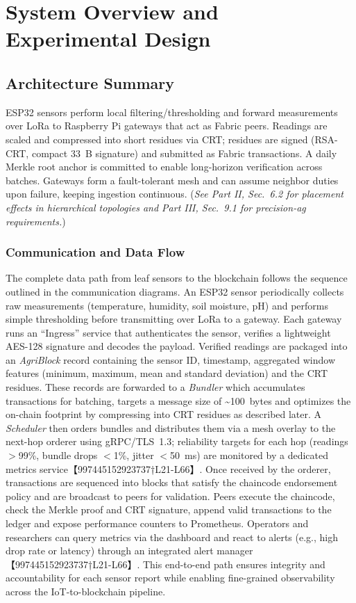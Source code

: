 \section{System Overview and Experimental Design}

\subsection{Architecture Summary}
ESP32 sensors perform local filtering/thresholding and forward measurements over LoRa to Raspberry Pi gateways that act as Fabric peers. Readings are scaled and compressed into short residues via CRT; residues are signed (RSA-CRT, compact 33~B signature) and submitted as Fabric transactions. A daily Merkle root anchor is committed to enable long-horizon verification across batches. Gateways form a fault-tolerant mesh and can assume neighbor duties upon failure, keeping ingestion continuous. (\emph{See Part II, Sec.~6.2 for placement effects in hierarchical topologies and Part III, Sec.~9.1 for precision-ag requirements.}) %

\subsubsection{Communication and Data Flow}
The complete data path from leaf sensors to the blockchain follows the sequence outlined in the communication diagrams.  An ESP32 sensor periodically collects raw measurements (temperature, humidity, soil moisture, pH) and performs simple thresholding before transmitting over LoRa to a gateway.  Each gateway runs an ``Ingress'' service that authenticates the sensor, verifies a lightweight AES-128 signature and decodes the payload.  Verified readings are packaged into an \textit{AgriBlock} record containing the sensor ID, timestamp, aggregated window features (minimum, maximum, mean and standard deviation) and the CRT residues.  These records are forwarded to a \textit{Bundler} which accumulates transactions for batching, targets a message size of \textasciitilde{}100~bytes and optimizes the on-chain footprint by compressing into CRT residues as described later.  A \textit{Scheduler} then orders bundles and distributes them via a mesh overlay to the next-hop orderer using gRPC/TLS~1.3; reliability targets for 
each hop (readings $>$99\%, bundle drops $<$1\%, jitter $<$50~ms) are monitored by a dedicated metrics service【997445152923737†L21-L66】.  Once received by the orderer, transactions are sequenced into blocks that satisfy the chaincode endorsement policy and are broadcast to peers for validation.  Peers execute the chaincode, check the Merkle proof and CRT signature, append valid transactions to the ledger and expose performance counters to Prometheus.  Operators and researchers can query metrics via the dashboard and react to alerts (e.g., high drop rate or latency) through an integrated alert manager【997445152923737†L21-L66】.  This end-to-end path ensures integrity and accountability for each sensor report while enabling fine-grained observability across the IoT-to-blockchain pipeline.

